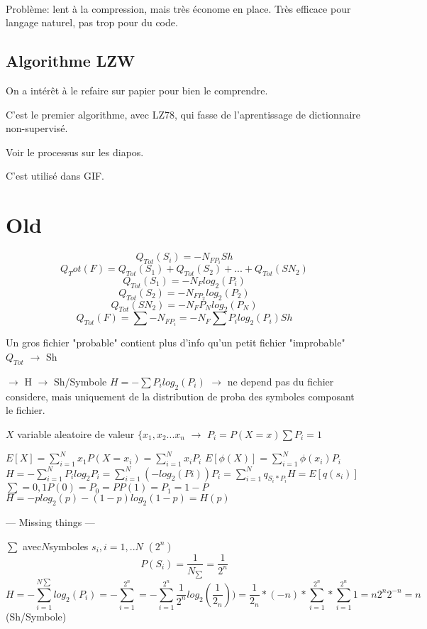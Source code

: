 \documentclass[a4paper,11pt]{article}
\begin{document}
\

Problème: lent à la compression, mais très économe en place. Très efficace pour
langage naturel, pas trop pour du code.

\subsection{Algorithme LZW}

On a intérêt à le refaire sur papier pour bien le comprendre.

C'est le premier algorithme, avec LZ78, qui fasse de l'aprentissage de
dictionnaire non-supervisé.

Voir le processus sur les diapos.

C'est utilisé dans GIF.







\section{Old}

$$
Q_{Tot}(S_{i}) = - N_{FP_{i}} Sh
$$ $$
Q_Tot(F) = Q_{Tot}(S_{1}) + Q_{Tot}(S_{2}) + ... + Q_{Tot}(S{N_{2}})
$$ $$
Q_{Tot}(S_{1}) = -N_{F}log_{2}(P_{i})
$$ $$
Q_{Tot}(S_{2}) = -N_{FP_{2}}log_{2}(P_{2})
$$ $$
Q_{Tot}(S{N_{2}}) = -N_{F}P_{N}log_{2}(P_{N})
$$ $$
Q_{Tot}(F) =  \sum -N_{FP_{i}}
= -N_{F} \sum P_{i}log_{2}(P_{i}) Sh
$$

Un gros fichier "probable" contient plus d'info qu'un petit fichier "improbable"
$
Q_{Tot} $ $\rightarrow$ Sh

$\rightarrow$ H $\rightarrow$ Sh/Symbole
$
H = - \sum P_{i}log_{2}(P_{i})$ $\rightarrow$ ne depend pas du fichier considere, mais uniquement
de la distribution de proba des symboles composant le fichier.



$X$ variable aleatoire de valeur $ \{ x_{1}, x_{2} ... x_{n} $
$\rightarrow$ $P_{i} = P(X = x) \sum P_{i} = 1$

$
E[X] = \sum_{i=1}^{N} x_{1} P(X = x_{i}) = \sum_{i = 1}^{N} x_{i} P_{i}
$ $
E[\phi (X)] = \sum_{i=1}^{N} \phi (x_{i})P_{i}
$ $
H= - \sum_{i= 1}^{N}P_{i}log_{2}P_{i} = \sum_{i = 1}^{N} (-log_{2}(Pi)) P_{i} = \sum_{i = 1}^{N}q_{S_{i} * P_{i}}
H = E[q(s_{i})]
$ $
\sum = {0,1} P(0) = P_{0} = P
             P(1) = P_{1} = 1 - P
$ $
H = -p log_{2}(p) - (1 - p) log_{2}(1 - p)
  = H(p)
$

---
Missing things
---



$\sum$ avec$ N $symboles $s_{i}, i = 1, .. N$
                                 $   (2^{n})$
$$
P(S_{i}) = \frac{1}{N_{\sum}} = \frac{1}{ 2^{n}}$$
$$
H = - \sum_{i = 1}^{N\sum} log_{2}(P_{i}) = - \sum_{i = 1}^{2^{n}}
  = -\sum_{i = 1}^{2^{n}} \frac{1}{2^{n}} log_{2} (\frac{1}{ 2_{n}}))
  = \frac{1}{ 2_{n}} * (-n) * \sum_{i = 1}^{2^{n}} * \sum_{i = 1}^{2^{n}} 1  
  = n2^{n}2^{-n} = n $$     (Sh/Symbole)
\end{document}

